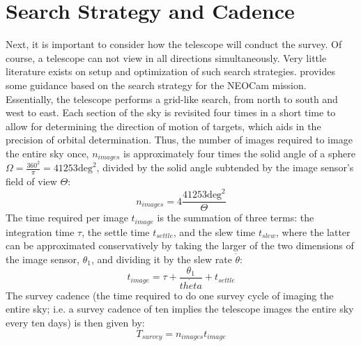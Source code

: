 \section{Search Strategy and Cadence}
\label{sec:modelling_cadence}
Next, it is important to consider how the telescope will conduct the survey. Of course, a telescope can not view in all directions simultaneously. Very little literature exists on setup and optimization of such search strategies. \cite{Cadence} provides some guidance based on the search strategy for the NEOCam mission. Essentially, the telescope performs a grid-like search, from north to south and west to east. Each section of the sky is revisited four times in a short time to allow for determining the direction of motion of targets, which aids in the precision of orbital determination. Thus, the number of images required to image the entire sky once, $n_{images}$ is approximately four times the solid angle of a sphere $\Omega = \frac{360^2}{\pi} = 41253\mathrm{deg}^2$, divided by the solid angle subtended by the image sensor's field of view $\Theta$:
\begin{equation}
 n_{images} = 4\frac{41253\mathrm{deg}^2}{\Theta}
\end{equation}
The time required per image $t_{image}$ is the summation of three terms: the integration time $\tau$, the settle time $t_{settle}$, and the slew time $t_{slew}$, where the latter can be approximated conservatively by taking the larger of the two dimensions of the image sensor, $\theta_1$, and dividing it by the slew rate $\dot{\theta}$:
\begin{equation}
 t_{image} = \tau + \frac{\theta_1}{\dot{theta}} + t_{settle}
\end{equation}
The survey cadence (the time required to do one survey cycle of imaging the entire sky; i.e. a survey cadence of ten implies the telescope images the entire sky every ten days) is then given by:
\begin{equation}
 T_{survey} = n_{images}t_{image}
\end{equation}


